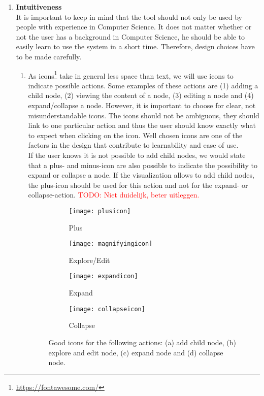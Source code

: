 \begin{enumerate}[label=\textbf{\arabic*}., ref=\arabic*]
	\item \textbf{Intuitiveness\label{item:intuitiveness}} \hfill \\
	It is important to keep in mind that the tool should not only be used by people with experience in Computer Science. It does not matter whether or not the user has a background in Computer Science, he should be able to easily learn to use the system in a short time. Therefore, design choices have to be made carefully. 
	
	\begin{enumerate}
	
		\item As icons\footnote{\url{https://fontawesome.com/}} take in general less space than text, we will use icons to indicate possible actions. Some examples of these actions are (1) adding a child node, (2) viewing the content of a node, (3) editing a node and (4) expand/collapse a node. However, it is important to choose for clear, not misunderstandable icons. The icons should not be ambiguous, they should link to one particular action and thus the user should know exactly what to expect when clicking on the icon. Well chosen icons are one of the factors in the design that contribute to learnability and ease of use.\\
	
		If the user knows it is not possible to add child nodes, we would state that a plus- and minus-icon are also possible to indicate the possibility to expand or collapse a node. If the visualization allows to add child nodes, the plus-icon should be used for this action and not for the expand- or collapse-action. \textcolor{red}{TODO: Niet duidelijk, beter uitleggen.}
			\begin{figure}[H]
				\centering
				\begin{subfigure}{.2\textwidth}
  					\centering
  					\texttt{[image: plusicon]}
  					\caption{Plus}
  					\label{fig:plusicon}
				\end{subfigure}%
				\begin{subfigure}{.2\textwidth}
  					\centering
  					\texttt{[image: magnifyingicon]}
  					\caption{Explore/Edit}
  					\label{fig:editicon}
				\end{subfigure}
				\begin{subfigure}{.2\textwidth}
  					\centering
  					\texttt{[image: expandicon]}
  					\caption{Expand}
  					\label{fig:expandicon}
				\end{subfigure}
				\begin{subfigure}{.2\textwidth}
  					\centering
  					\texttt{[image: collapseicon]}
  					\caption{Collapse}
  					\label{fig:collapseicon}
				\end{subfigure}
				\caption{Good icons for the following actions: (a) add child node, (b) explore and edit node, (c) expand node and (d) collapse node.}
				\label{fig:icons}
			\end{figure}
			

\end{enumerate}
\end{enumerate}
